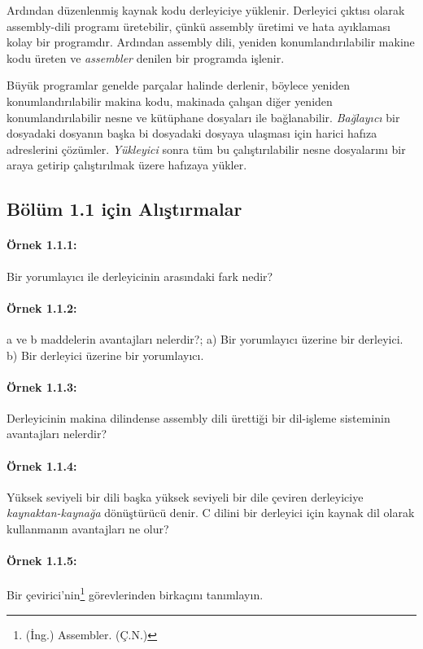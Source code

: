 Ardından düzenlenmiş kaynak kodu derleyiciye yüklenir. Derleyici çıktısı olarak assembly-dili programı üretebilir, çünkü assembly üretimi ve hata ayıklaması kolay bir programdır. Ardından assembly dili, yeniden konumlandırılabilir makine kodu üreten ve \textit{assembler} denilen bir programda işlenir.

Büyük programlar genelde parçalar halinde derlenir, böylece yeniden konumlandırılabilir makina kodu, makinada çalışan diğer yeniden konumlandırılabilir nesne ve kütüphane dosyaları ile bağlanabilir. \textit{Bağlayıcı} bir dosyadaki dosyanın başka bi dosyadaki dosyaya ulaşması için harici hafıza adreslerini çözümler. \textit{Yükleyici} sonra tüm bu çalıştırılabilir nesne dosyalarını bir araya getirip çalıştırılmak üzere hafızaya yükler.  

\subsection{Bölüm 1.1 için Alıştırmalar}

\paragraph{Örnek 1.1.1:} Bir yorumlayıcı ile derleyicinin arasındaki fark nedir?

\paragraph{Örnek 1.1.2:}  a ve b maddelerin avantajları nelerdir?; a) Bir yorumlayıcı üzerine bir derleyici. b) Bir derleyici üzerine bir yorumlayıcı.

\paragraph{Örnek 1.1.3:} Derleyicinin makina dilindense assembly dili ürettiği bir dil-işleme sisteminin avantajları nelerdir?

\paragraph{Örnek 1.1.4:} Yüksek seviyeli bir dili başka yüksek seviyeli bir dile çeviren derleyiciye \textit{kaynaktan-kaynağa} dönüştürücü denir. C dilini bir derleyici için kaynak dil olarak kullanmanın avantajları ne olur?

\setcounter{footnote}{0}
\paragraph{Örnek 1.1.5:}  Bir çevirici'nin\footnote{(İng.) Assembler. (Ç.N.)} görevlerinden birkaçını tanımlayın.

